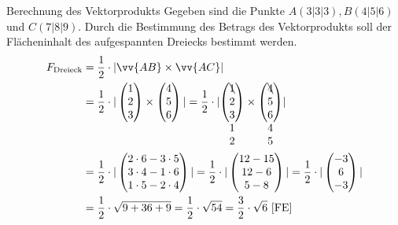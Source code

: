 \begin{bsp}{Berechnung des Vektorprodukts}{}
Gegeben sind die Punkte $A(3|3|3), B(4|5|6)$ und $C(7|8|9)$. Durch die Bestimmung des Betrags des Vektorprodukts soll der Flächeninhalt des aufgespannten Dreiecks bestimmt werden.
\begin{equation*}
    \begin{split}
        F_{\text{Dreieck}} &= \dfrac{1}{2} \cdot |\vv{AB} \times \vv{AC}|\\
        &= \dfrac{1}{2} \cdot |\begin{pmatrix} 1 \\ 2 \\ 3 \end{pmatrix} \times \begin{pmatrix} 4 \\ 5 \\ 6 \end{pmatrix}|
        = \dfrac{1}{2} \cdot |
\begin{array}[t]{@{}c@{}}
\begin{pmatrix} \bcancel{1} \\ 2 \\ 3 \end{pmatrix} \\ 1 \\ 2
\end{array}
\times
\begin{array}[t]{@{}c@{}}
\begin{pmatrix} \bcancel{4} \\ 5\\ 6 \end{pmatrix} \\ 4 \\ 5
\end{array}|\\
&=
\dfrac{1}{2} \cdot |\begin{pmatrix}
2\cdot 6-3\cdot 5 \\
3\cdot 4-1\cdot 6 \\
1\cdot 5-2\cdot 4
\end{pmatrix}|
=\dfrac{1}{2} \cdot | \begin{pmatrix}
12-15 \\
12-6 \\
5-8
\end{pmatrix}| =\dfrac{1}{2} \cdot |\begin{pmatrix}
-3 \\
6 \\
-3
\end{pmatrix}|\\
&= \dfrac{1}{2} \cdot \sqrt{9+36+9} = \dfrac{1}{2} \cdot \sqrt{54} =\dfrac{3}{2} \cdot \sqrt{6} \ \text{[FE]} 
    \end{split}
\end{equation*}
\end{bsp}
